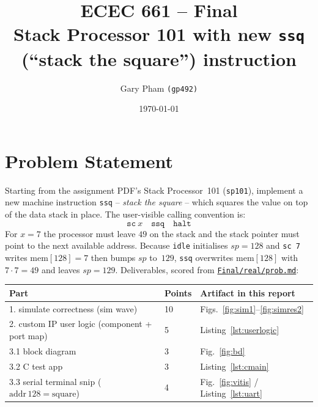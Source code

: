 \documentclass[11pt,letterpaper]{article}
\title{\vspace{-0.6in}\textbf{ECEC 661 -- Final}\\
       \large Stack Processor 101 with new \texttt{ssq} (``stack the square'') instruction}
\author{Gary Pham \texttt{(gp492)}}
\date{\today}
\begin{document}
\maketitle
\vspace{-0.25in}

\section{Problem Statement}

Starting from the assignment PDF's Stack Processor~101 (\texttt{sp101}),
implement a new machine instruction \texttt{ssq} -- \emph{stack the
square} -- which squares the value on top of the data stack in place.
The user-visible calling convention is:
\[
\texttt{sc}\ x\quad\texttt{ssq}\quad\texttt{halt}
\]
For \(x=7\) the processor must leave \(49\) on the stack and the stack
pointer must point to the next available address.  Because
\texttt{idle} initialises \(\mathit{sp}=128\) and \texttt{sc 7} writes
\(\mathrm{mem}[128]=7\) then bumps \(\mathit{sp}\) to~\(129\),
\texttt{ssq} overwrites \(\mathrm{mem}[128]\) with \(7\cdot7=49\) and
leaves \(\mathit{sp}=129\).  Deliverables, scored from
\href{run:../prob.md}{\texttt{Final/real/prob.md}}:

\begin{table}[H]
    \centering
    \small
    \begin{tabular}{lll}
        \toprule
        \textbf{Part} & \textbf{Points} & \textbf{Artifact in this report} \\
        \midrule
        1. simulate correctness (sim wave)           & 10 & Figs.~\ref{fig:sim1}--\ref{fig:simres2} \\
        2. custom IP user logic (component + port map) & 5 & Listing~\ref{lst:userlogic} \\
        3.1 block diagram                            & 3 & Fig.~\ref{fig:bd} \\
        3.2 C test app                               & 3 & Listing~\ref{lst:cmain} \\
        3.3 serial terminal snip (\(\mathrm{addr}\,128=\mathrm{square}\)) & 4 & Fig.~\ref{fig:vitis} / Listing~\ref{lst:uart} \\
        \bottomrule
    \end{tabular}
\end{table}
\end{document}
